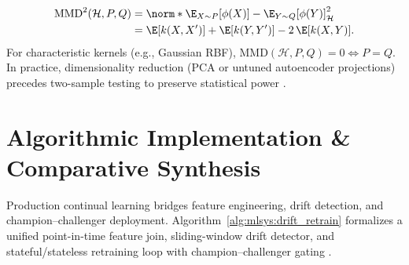 \documentclass[../../../../master.tex]{subfiles}
\begin{document}
\begin{coremath}
\begin{enumerate}
  \begin{equation}\label{eq:mlsys:mmd}
  \begin{aligned}
    \mathrm{MMD}^2(\mathcal{H}, P, Q)
    &= \norm*{\E_{X \sim P}[\phi(X)] - \E_{Y \sim Q}[\phi(Y)]}_{\mathcal{H}}^2 \\
    &= \E[k(X, X')] + \E[k(Y, Y')] - 2\,\E[k(X, Y)].
  \end{aligned}
  \end{equation}
  For characteristic kernels (e.g., Gaussian RBF), $\mathrm{MMD}(\mathcal{H}, P, Q) = 0 \iff P = Q$. In practice, dimensionality reduction (PCA or untuned autoencoder projections) precedes two-sample testing to preserve statistical power .
\end{enumerate}
\end{coremath}

\section{Algorithmic Implementation \& Comparative Synthesis}\label{sec:mlsys:algorithms}

Production continual learning bridges feature engineering, drift detection, and champion--challenger deployment. Algorithm~\ref{alg:mlsys:drift_retrain} formalizes a unified point-in-time feature join, sliding-window drift detector, and stateful/stateless retraining loop with champion--challenger gating .
\end{document}
